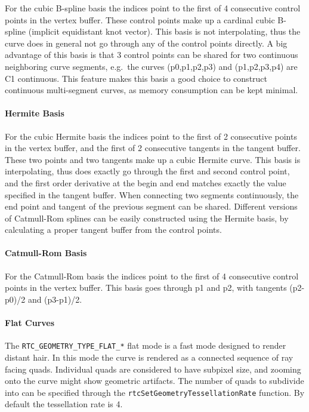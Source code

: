 For the cubic B-spline basis the indices point to the first of 4
consecutive control points in the vertex buffer. These control points
make up a cardinal cubic B-spline (implicit equidistant knot vector).
This basis is not interpolating, thus the curve does in general not go
through any of the control points directly. A big advantage of this
basis is that 3 control points can be shared for two continuous
neighboring curve segments, e.g.~the curves (p0,p1,p2,p3) and
(p1,p2,p3,p4) are C1 continuous. This feature makes this basis a good
choice to construct continuous multi-segment curves, as memory
consumption can be kept minimal.

\paragraph{Hermite Basis}\label{hermite-basis}

For the cubic Hermite basis the indices point to the first of 2
consecutive points in the vertex buffer, and the first of 2 consecutive
tangents in the tangent buffer. These two points and two tangents make
up a cubic Hermite curve. This basis is interpolating, thus does exactly
go through the first and second control point, and the first order
derivative at the begin and end matches exactly the value specified in
the tangent buffer. When connecting two segments continuously, the end
point and tangent of the previous segment can be shared. Different
versions of Catmull-Rom splines can be easily constructed using the
Hermite basis, by calculating a proper tangent buffer from the control
points.

\paragraph{Catmull-Rom Basis}\label{catmull-rom-basis}

For the Catmull-Rom basis the indices point to the first of 4
consecutive control points in the vertex buffer. This basis goes through
p1 and p2, with tangents (p2-p0)/2 and (p3-p1)/2.

\paragraph{Flat Curves}\label{flat-curves}

The \texttt{RTC\_GEOMETRY\_TYPE\_FLAT\_*} flat mode is a fast mode
designed to render distant hair. In this mode the curve is rendered as a
connected sequence of ray facing quads. Individual quads are considered
to have subpixel size, and zooming onto the curve might show geometric
artifacts. The number of quads to subdivide into can be specified
through the \texttt{rtcSetGeometryTessellationRate} function. By default
the tessellation rate is 4.

